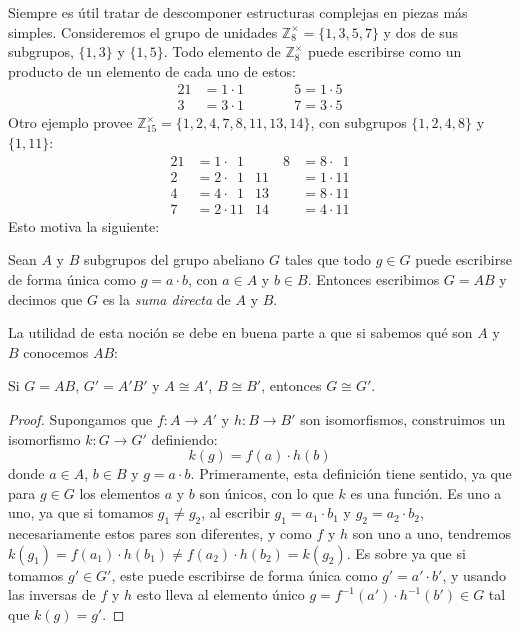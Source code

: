   Siempre es útil tratar de descomponer estructuras complejas
  en piezas más simples.
  Consideremos
  el grupo de unidades \(\mathbb{Z}^\times_8 = \{1, 3, 5, 7\}\)
  y dos de sus subgrupos,
  \(\{1, 3\}\) y \(\{1, 5\}\).
  Todo elemento de \(\mathbb{Z}^\times_8\)
  puede escribirse como un producto de un elemento de cada uno de estos:
  \begin{alignat*}{2}
    1 &= 1 \cdot 1 &\qquad& 5 = 1 \cdot 5 \\
    3 &= 3 \cdot 1 &&	    7 = 3 \cdot 5
  \end{alignat*}
  Otro ejemplo
  provee \(\mathbb{Z}^\times_{15} = \{1, 2, 4, 7, 8, 11, 13, 14\}\),
  con subgrupos \(\{1, 2, 4, 8\}\) y \(\{1, 11\}\):
  \begin{alignat*}{2}
     1 &= 1 \cdot \phantom{0}1
       &\qquad	8 &= 8 \cdot \phantom{0}1 \\
     2 &= 2 \cdot \phantom{0}1
       &       11 &= 1 \cdot 11 \\
     4 &= 4 \cdot \phantom{0}1
       &       13 &= 8 \cdot 11 \\
     7 &= 2 \cdot 11
       &       14 &= 4 \cdot 11
  \end{alignat*}
  Esto motiva la siguiente:
  \begin{definition}
    \label{def:suma-directa}
    Sean \(A\) y \(B\) subgrupos del grupo abeliano \(G\)
    tales que todo \(g \in G\) puede escribirse de forma única
    como \(g = a \cdot b\),
    con \(a \in A\) y \(b \in B\).
    Entonces escribimos \(G = A B\)
    y decimos que \(G\) es la \emph{suma directa} de \(A\) y \(B\).
  \end{definition}
  La utilidad de esta noción se debe en buena parte
  a que si sabemos qué son \(A\) y \(B\)
  conocemos \(A B\):
  \begin{theorem}
    \label{theo:suma-directa-isomorfos}
    Si \(G = A B\),
    \(G' = A' B'\)
    y \(A \cong A'\), \(B \cong B'\),
    entonces \(G \cong G'\).
  \end{theorem}
  \begin{proof}
    Supongamos que
    \(f \colon A \rightarrow A'\) y \(h \colon B \rightarrow B'\)
    son isomorfismos,
    construimos un isomorfismo \(k \colon G \rightarrow G'\)
    definiendo:
    \begin{equation*}
      k(g) = f(a) \cdot h(b)
    \end{equation*}
    donde \(a \in A\), \(b \in B\) y \(g = a \cdot b\).
    Primeramente,
    esta definición tiene sentido,
    ya que para \(g \in G\) los elementos \(a\) y \(b\) son únicos,
    con lo que \(k\) es una función.
    Es uno a uno,
    ya que si tomamos \(g_1 \ne g_2\),
    al escribir \(g_1 = a_1 \cdot b_1\) y \(g_2 = a_2 \cdot b_2\),
    necesariamente estos pares son diferentes,
    y como \(f\) y \(h\) son uno a uno,
    tendremos
    \(k(g_1) = f(a_1) \cdot h(b_1) \ne f(a_2) \cdot h(b_2) = k(g_2)\).
    Es sobre ya que si tomamos \(g' \in G'\),
    este puede escribirse de forma única como \(g' = a' \cdot b'\),
    y usando las inversas de \(f\) y \(h\)
    esto lleva al elemento único
    \(g = f^{-1}(a') \cdot h^{-1}(b') \in G\)
    tal que \(k(g) = g'\).
  \end{proof}
